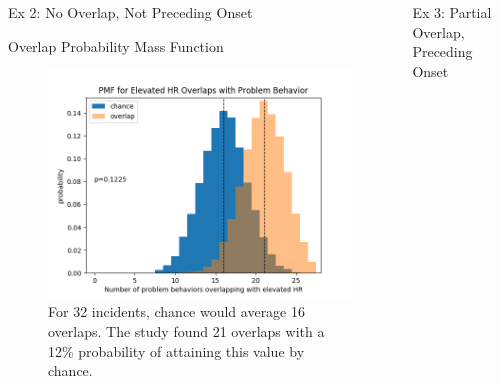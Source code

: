 \documentclass[final]{beamer}
\newlength{\onecolwid}
\newlength{\twocolwid}
\begin{document}
\begin{frame}[t]
\begin{columns}[t]
\begin{column}{\twocolwid}
\begin{columns}[t,totalwidth=\twocolwid]
\begin{column}{\onecolwid}
\begin{block}{Ex 2: No Overlap, Not Preceding Onset}
\end{block}


\begin{block}{Overlap Probability Mass Function}
	
	\begin{figure}
		\includegraphics[width=0.8\linewidth]{Overlap.png}
		\caption{For 32 incidents, chance would average 16 overlaps. The study found 21 overlaps with a 12\% probability of attaining this value by chance.}
	\end{figure}
	
\end{block}


\end{column} %


\begin{column}{\onecolwid}\vspace{-.6in} %


\begin{block}{Ex 3: Partial Overlap, Preceding Onset}
	

\end{block}
\end{column}
\end{columns}
\end{column}
\end{columns}
\end{frame}
\end{document}
